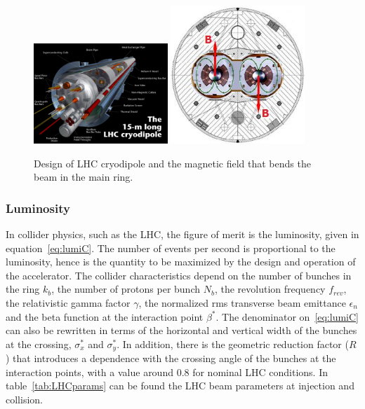 \begin{figure}[!Hhtbp]
  \begin{center}
    \includegraphics[width=0.45\textwidth]{figs/cryodipole.jpg}
    \includegraphics[width=0.45\textwidth]{figs/dipole_B.jpg}
    \caption{Design of LHC cryodipole and the magnetic field that bends the beam in the main ring.}
    \label{fig:dipole}
  \end{center}
\end{figure}

\subsubsection{Luminosity}
\label{sec:lumi}

In collider physics, such as the LHC, the figure of merit is the luminosity, given in equation~\ref{eq:lumiC}. The number of events per second is proportional to the luminosity, hence is the quantity to be maximized by the design and operation of the accelerator. The collider characteristics depend on the number of bunches in the ring $k_{b}$, the number of protons per bunch $N_{b}$, the revolution frequency $f_{rev}$, the relativistic gamma factor $\gamma$, the normalized rms transverse beam emittance $\epsilon_{n}$ and the beta function at the interaction point $\beta^{*}$. The denominator on~\ref{eq:lumiC} can also be rewritten in terms of the horizontal and vertical width of the bunches at the crossing, $\sigma^{*}_{x}$ and $\sigma^{*}_{y}$. In addition, there is the geometric reduction factor ($R$) that introduces a dependence with the crossing angle of the bunches at the interaction points, with a value around 0.8 for nominal LHC conditions. In table~\ref{tab:LHCparams} can be found the LHC beam parameters at injection and collision.  

